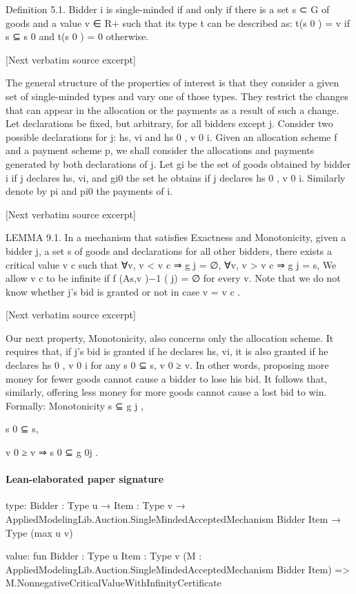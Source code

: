 \documentclass[10pt]{article}
\begin{document}
\begin{ReviewVerbatim}

Definition 5.1. Bidder i is single-minded if and only if there is a set s ⊂ G of
goods and a value v ∈ R+ such that its type t can be described as: t(s 0 ) = v if s ⊆ s 0
and t(s 0 ) = 0 otherwise.

[Next verbatim source excerpt]

The general structure of the properties of interest is that they consider a given
set of single-minded types and vary one of those types. They restrict the changes
that can appear in the allocation or the payments as a result of such a change.
Let declarations be fixed, but arbitrary, for all bidders except j. Consider two
possible declarations for j: hs, vi and hs 0 , v 0 i. Given an allocation scheme f and a
payment scheme p, we shall consider the allocations and payments generated by
both declarations of j. Let gi be the set of goods obtained by bidder i if j declares
hs, vi, and gi0 the set he obtains if j declares hs 0 , v 0 i. Similarly denote by pi and pi0
the payments of i.

[Next verbatim source excerpt]

LEMMA 9.1. In a mechanism that satisfies Exactness and Monotonicity, given
a bidder j, a set s of goods and declarations for all other bidders, there exists a
critical value v c such that
∀v, v < v c ⇒ g j = ∅,
∀v, v > v c ⇒ g j = s,
We allow v c to be infinite if f (As,v )−1 ( j) = ∅ for every v. Note that we do not
know whether j’s bid is granted or not in case v = v c .

[Next verbatim source excerpt]

Our next property, Monotonicity, also concerns only the allocation scheme. It
requires that, if j’s bid is granted if he declares hs, vi, it is also granted if he
declares hs 0 , v 0 i for any s 0 ⊆ s, v 0 ≥ v. In other words, proposing more money for
fewer goods cannot cause a bidder to lose his bid. It follows that, similarly, offering
less money for more goods cannot cause a lost bid to win. Formally:
Monotonicity s ⊆ g j ,

s 0 ⊆ s,

v 0 ≥ v ⇒ s 0 ⊆ g 0j .
\end{ReviewVerbatim}



\paragraph{Lean-elaborated paper signature}
\begin{ReviewVerbatim}
type:
{Bidder : Type u} →
  {Item : Type v} → AppliedModelingLib.Auction.SingleMindedAcceptedMechanism Bidder Item → Type (max u v)

value:
fun {Bidder : Type u} {Item : Type v} (M : AppliedModelingLib.Auction.SingleMindedAcceptedMechanism Bidder Item) =>
  M.NonnegativeCriticalValueWithInfinityCertificate
\end{ReviewVerbatim}
\end{document}
